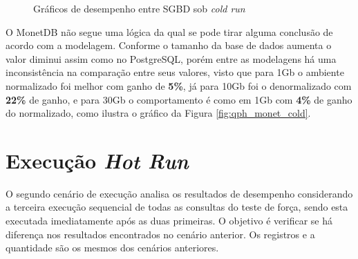 \begin{figure}[htpb]
        \centering
        \caption{Gráficos de desempenho entre SGBD sob \textit{cold run}}
        \label{fig:qph_sgbd_cold}
\end{figure}

O MonetDB não segue uma lógica da qual se pode tirar alguma conclusão de acordo com a modelagem. Conforme o tamanho da base de dados aumenta o valor diminui assim como no PostgreSQL, porém entre as modelagens há uma inconsistência na comparação entre seus valores, visto que para 1Gb o ambiente normalizado foi melhor com ganho de \textbf{5\%}, já para 10Gb foi o denormalizado com \textbf{22\%} de ganho, e para 30Gb o comportamento é como em 1Gb com \textbf{4\%} de ganho do normalizado, como ilustra o gráfico da Figura \ref{fig:qph_monet_cold}. 


\section{Execução \textit{Hot Run}}

O segundo cenário de execução analisa os resultados de desempenho considerando a terceira execução sequencial de todas as consultas do teste de força, sendo esta executada imediatamente após as duas primeiras. O objetivo é verificar se há diferença nos resultados encontrados no cenário anterior. Os registros e a quantidade são os mesmos dos cenários anteriores. 

